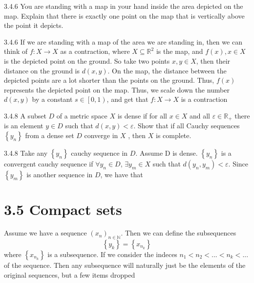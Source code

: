 \documentclass[a4paper,norsk]{article}
\renewcommand{\epsilon}{\varepsilon}
\begin{document}
\begin{oppgavebox}{3.4.6}{}
You are standing with a map in your hand inside the area depicted on the map. Explain that there is exactly one point on the map that is vertically above the point it depicts.

\begin{proofbox}{3.4.6}{}
  If we are standing with a map of the area we are standing in, then we can think of $ f : X \to X$ as a contraction, where $ X \subseteq \mathbb{R}^2 $ is the map, and $ f(x), x \in X $ is the depicted point on the ground. So take two points $ x, y \in X $, then their distance on the ground is $ d \left( x, y \right)  $. On the map, the distance between the depicted points are a lot shorter than the points on the ground. Thus, $ f(x) $ represents the depicted point on the map. Thus, we scale down the number $ d \left( x, y \right)  $ by a constant $ s \in \left[ 0, 1 \right) $, and get that $ f : X \to X $ is a contraction
\end{proofbox}
\end{oppgavebox}

\begin{oppgavebox}{3.4.8}{}
A subset $ D $  of a metric space  $ X $  is dense if for all $ x \in X $  and all $ \epsilon \in \mathbb{R}_+ $ there is an element $ y \in D $  such that $d(x,y) < \epsilon $. Show that if all Cauchy sequences $ \left\{ y_n \right\} $ from a dense set $ D $ converge in $ X $ , then $ X $  is complete.

\begin{proofbox}{3.4.8}{}
  Take any $ \left\{ y_n \right\}  $ cauchy sequence in $ D $. Assume D is dense. $ \left\{ y_n \right\}  $ is a convergent cauchy sequence if $ \forall y_n \in D $, $ \exists y_m \in X $ such that $ d \left( y_n, y_m \right) < \epsilon $. Since $ \left\{ y_m \right\}  $  is another sequence in $ D $, we have that 
\end{proofbox}

\end{oppgavebox}



\section*{3.5 Compact sets}

Assume we have a sequence $ \left( x_n \right) _{n \in \mathbb{N}} $. Then we can define the subsequences
\[
    \left\{ y_k \right\} = \left\{ x_{n_k} \right\} 
\]
where $ \left\{ x_{n_k} \right\}  $ is a subsequence. If we consider the indeces $ n_1 < n_2 < ... < n_k < ... $ of the sequence. Then any subsequence will naturally just be the elements of the original sequences, but a few items dropped
\end{document}
